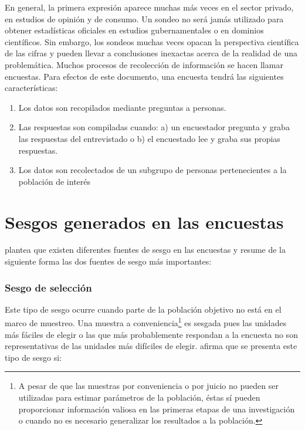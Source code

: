\documentclass[
  10pt,
  spanish,
]{book}
\providecommand{\tightlist}{%
  \setlength{\itemsep}{0pt}\setlength{\parskip}{0pt}}
\begin{document}
En general, la primera expresión aparece muchas más veces en el sector privado, en estudios de opinión y de consumo. Un sondeo no será jamás utilizado para obtener estadísticas oficiales en estudios gubernamentales o en dominios científicos. Sin embargo, los sondeos muchas veces opacan la perspectiva científica de las cifras y pueden llevar a conclusiones inexactas acerca de la realidad de una problemática. Muchos procesos de recolección de información se hacen llamar encuestas. Para efectos de este documento, una encuesta tendrá las siguientes características:

\begin{enumerate}
\def\labelenumi{\arabic{enumi}.}
\tightlist
\item
  Los datos son recopilados mediante preguntas a personas.
\item
  Las respuestas son compiladas cuando: a) un encuestador pregunta y graba las respuestas del entrevistado o b) el encuestado lee y graba sus propias respuestas.
\item
  Los datos son recolectados de un subgrupo de personas pertenecientes a la población de interés
\end{enumerate}

\hypertarget{sesgos-generados-en-las-encuestas}{%
\section{Sesgos generados en las encuestas}\label{sesgos-generados-en-las-encuestas}}

\citet{Gutierrez_2016} plantea que existen diferentes fuentes de sesgo en las encuestas y resume de la siguiente forma las dos fuentes de sesgo más importantes:

\hypertarget{sesgo-de-selecciuxf3n}{%
\subsubsection*{Sesgo de selección}\label{sesgo-de-selecciuxf3n}}

Este tipo de sesgo ocurre cuando parte de la población objetivo no está en el marco de muestreo. Una muestra a conveniencia\footnote{A pesar de que las muestras por conveniencia o por juicio no pueden ser utilizadas para estimar parámetros de la población, éstas sí pueden proporcionar información valiosa en las primeras etapas de una investigación o cuando no es necesario generalizar los resultados a la población.} es sesgada pues las unidades más fáciles de elegir o las que más probablemente respondan a la encuesta no son representativas de las unidades más difíciles de elegir. \citet{Loh} afirma que se presenta este tipo de sesgo si:
\end{document}

